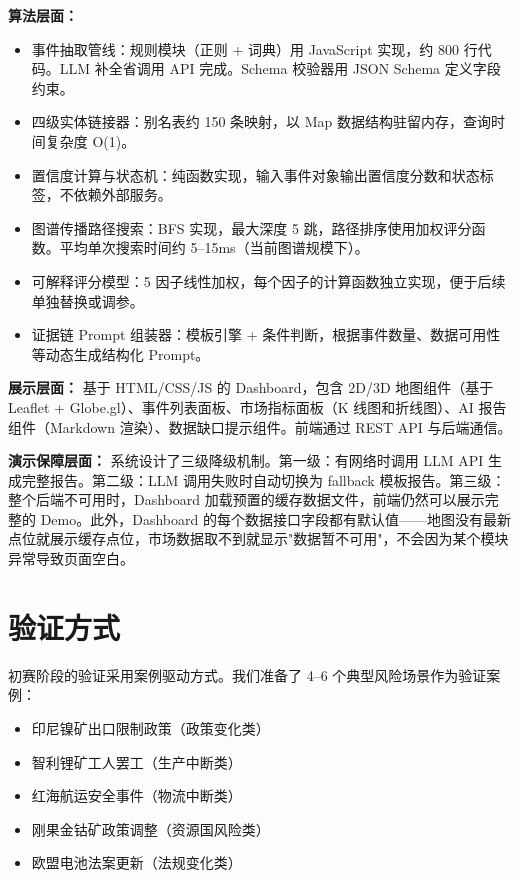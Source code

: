 \documentclass[12pt,a4paper]{ctexart}
\begin{document}
\textbf{算法层面：} 
\begin{itemize}
    \item 事件抽取管线：规则模块（正则 + 词典）用 JavaScript 实现，约 800 行代码。LLM 补全省调用 API 完成。Schema 校验器用 JSON Schema 定义字段约束。
    \item 四级实体链接器：别名表约 150 条映射，以 Map 数据结构驻留内存，查询时间复杂度 O(1)。
    \item 置信度计算与状态机：纯函数实现，输入事件对象输出置信度分数和状态标签，不依赖外部服务。
    \item 图谱传播路径搜索：BFS 实现，最大深度 5 跳，路径排序使用加权评分函数。平均单次搜索时间约 5--15ms（当前图谱规模下）。
    \item 可解释评分模型：5 因子线性加权，每个因子的计算函数独立实现，便于后续单独替换或调参。
    \item 证据链 Prompt 组装器：模板引擎 + 条件判断，根据事件数量、数据可用性等动态生成结构化 Prompt。
\end{itemize}

\textbf{展示层面：} 基于 HTML/CSS/JS 的 Dashboard，包含 2D/3D 地图组件（基于 Leaflet + Globe.gl）、事件列表面板、市场指标面板（K 线图和折线图）、AI 报告组件（Markdown 渲染）、数据缺口提示组件。前端通过 REST API 与后端通信。

\textbf{演示保障层面：} 系统设计了三级降级机制。第一级：有网络时调用 LLM API 生成完整报告。第二级：LLM 调用失败时自动切换为 fallback 模板报告。第三级：整个后端不可用时，Dashboard 加载预置的缓存数据文件，前端仍然可以展示完整的 Demo。此外，Dashboard 的每个数据接口字段都有默认值——地图没有最新点位就展示缓存点位，市场数据取不到就显示"数据暂不可用"，不会因为某个模块异常导致页面空白。

\section{验证方式}

初赛阶段的验证采用案例驱动方式。我们准备了 4--6 个典型风险场景作为验证案例：

\begin{itemize}
    \item 印尼镍矿出口限制政策（政策变化类）
    \item 智利锂矿工人罢工（生产中断类）
    \item 红海航运安全事件（物流中断类）
    \item 刚果金钴矿政策调整（资源国风险类）
    \item 欧盟电池法案更新（法规变化类）
\end{itemize}
\end{document}
